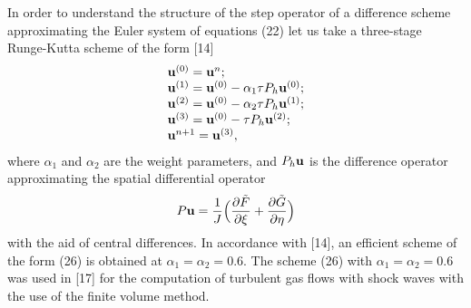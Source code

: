    In order to understand the structure of the step operator of a difference
scheme approximating the Euler system of equations (22) let us take a
three-stage Runge-Kutta scheme of the form [14]
\begin{eqnarray}
\begin{array}{l}
{\bf u}^{(0)}={\bf u}^n;\\
{\bf u}^{(1)}={\bf u}^{(0)} - \alpha_1\tau P_h{\bf u}^{(0)};\\
{\bf u}^{(2)}={\bf u}^{(0)} - \alpha_2\tau P_h{\bf u}^{(1)};\\
{\bf u}^{(3)}={\bf u}^{(0)} - \tau P_h{\bf u}^{(2)};\\
{\bf u}^{n+1}={\bf u}^{(3)},
\end{array}
\end{eqnarray}
where $\alpha_1$ and $\alpha_2$ are the weight parameters, and $P_h{\bf u}$ is
the difference operator approximating the spatial differential operator
\begin{equation}
P{\bf u}=\frac{1}{J}\Bigl(\frac{\partial \tilde{F}}{\partial \xi} +
\frac{\partial \tilde{G}}{\partial \eta}\Bigr)
\end{equation}
with the aid of central differences. In accordance with [14], an efficient
scheme of the form (26) is obtained at $\alpha_1=\alpha_2=0.6$. The scheme
(26) with $\alpha_1=\alpha_2=0.6$ was used in [17] for the computation of
turbulent gas flows with shock waves with the use of the finite volume method.

